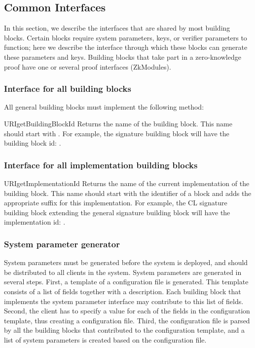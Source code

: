 
  \subsection{Common Interfaces}
  \label{sec:blocks:common}
  In this section, we describe the interfaces that are shared by most
  building blocks. Certain blocks require system parameters, keys, or verifier
  parameters to function; here we describe the interface through which these
  blocks can generate these parameters and keys. Building blocks that take part
  in a zero-knowledge proof have one or several proof interfaces (ZkModules).

    \subsubsection{Interface for all building blocks}
    \label{sec:intf:all}
    All general building blocks must implement the following method:
      \begin{getter}{URI}{getBuildingBlockId}
      Returns the name of the building block.
      This name should start with \identifier{}.
      For example, the signature building block will have the building block 
      id: .
      \end{getter}
    \subsubsection{Interface for all implementation building blocks}
    \label{sec:intf:major}
      \begin{getter}{URI}{getImplementationId}
      Returns the name of the current implementation of the building block.
      This name should start with the identifier of a block and adds the
      appropriate suffix for this implementation. For example, the CL signature
      building block extending the general signature building block will
      have the implementation id: .
      \end{getter}


    \subsubsection{System parameter generator}
    \label{sec:intf:syspargen}
    System parameters must be generated before the system is deployed, and
    should be distributed to all clients in the system.
    System parameters are generated in several steps. 
    First, a template of a configuration file is generated. 
    This template consists of a list of fields together with a description. 
    Each building block that implements the
    system parameter interface may contribute to this list of fields.
    Second, the client has to specify a value for each of the fields
    in the configuration template, thus creating a configuration file.
    Third, the configuration file is parsed by all the building
    blocks that contributed to the configuration template, 
    and a list of system parameters is created based on
    the configuration file.

